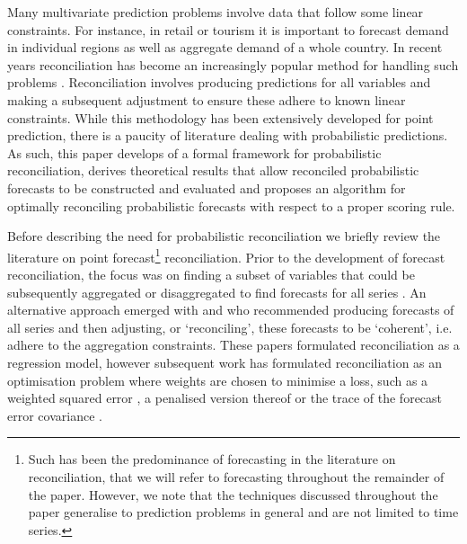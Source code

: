 \documentclass[12pt]{article}
\theoremstyle{definition}
\begin{document}
Many multivariate prediction problems involve data that follow some linear constraints.  For instance, in retail or tourism it is important to forecast demand in individual regions as well as aggregate demand of a whole country.  In recent years reconciliation has become an increasingly popular method for handling such problems \citep[see][for an overview]{FPP2018}.  Reconciliation involves producing predictions for all variables and making a subsequent adjustment to ensure these adhere to known linear constraints.  While this methodology has been extensively developed for point prediction, there is a paucity of literature dealing with probabilistic predictions.  As such, this paper develops of a formal framework for probabilistic reconciliation, derives theoretical results that allow reconciled probabilistic forecasts to be constructed and evaluated and proposes an algorithm for optimally reconciling probabilistic forecasts with respect to a proper scoring rule.

Before describing the need for probabilistic reconciliation we briefly review the literature on point forecast\footnote{Such has been the predominance of forecasting in the literature on reconciliation, that we will refer to forecasting throughout the remainder of the paper.  However, we note that the techniques discussed throughout the paper generalise to prediction problems in general and are not limited to time series.} reconciliation.  Prior to the development of forecast reconciliation, the focus was on finding a subset of variables that could be subsequently aggregated or disaggregated to find forecasts for all series \citep[see][and references therin]{Dunn1976,Gross1990}.  An alternative approach emerged with \cite{AthEtAl2009} and \cite{HynEtAl2011} who recommended producing forecasts of all series and then adjusting, or `reconciling', these forecasts to be `coherent', i.e. adhere to the aggregation constraints. These papers formulated reconciliation as a regression model, however subsequent work has formulated reconciliation as an optimisation problem where weights are chosen to minimise a loss, such as a weighted squared error \citep{VanErven2015a,nystrup2020}, a penalised version thereof \citep{bentaiebkoo} or the trace of the forecast error covariance \citep{WicEtAl2019}. 
\end{document}
